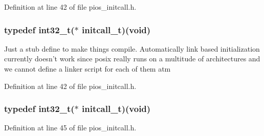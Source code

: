 Definition at line 42 of file pios\-\_\-initcall.\-h.

\hypertarget{group___p_i_o_s___i_n_i_t_c_a_l_l_ga4f58a033b271ad632c4583977de7e3c0}{
\subsubsection[{initcall\-\_\-t}]{\setlength{\rightskip}{0pt plus 5cm}typedef {\bf int32\-\_\-t}($\ast$ initcall\-\_\-t)({\bf void})}}\label{group___p_i_o_s___i_n_i_t_c_a_l_l_ga4f58a033b271ad632c4583977de7e3c0}
Just a stub define to make things compile. Automatically link based initialization currently doesn't work since posix really runs on a multitude of architectures and we cannot define a linker script for each of them atm 

Definition at line 42 of file pios\-\_\-initcall.\-h.

\hypertarget{group___p_i_o_s___i_n_i_t_c_a_l_l_ga4f58a033b271ad632c4583977de7e3c0}{
\subsubsection[{initcall\-\_\-t}]{\setlength{\rightskip}{0pt plus 5cm}typedef {\bf int32\-\_\-t}($\ast$ initcall\-\_\-t)({\bf void})}}\label{group___p_i_o_s___i_n_i_t_c_a_l_l_ga4f58a033b271ad632c4583977de7e3c0}


Definition at line 45 of file pios\-\_\-initcall.\-h.



